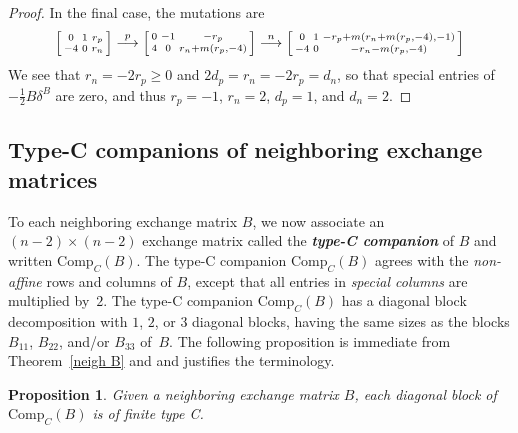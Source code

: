 \documentclass[10pt]{article}
\newtheorem{proposition}{Proposition}[section]
\theoremstyle{definition}
\theoremstyle{remark}
\numberwithin{equation}{section}
\newcommand{\newword}[1]{\textbf{\emph{#1}}}
\newcommand{\0}{{\mathbf{0}}}
\newcommand{\Comp}{\mathrm{Comp}_C}
\begin{document}
\begin{proof}
In the final case, the mutations are
\[\begin{bsmallmatrix*}
0 & 1 & r_p\\
-4 & 0 &r_n
\end{bsmallmatrix*}\overset{p}{\longrightarrow} 
\begin{bsmallmatrix*}
0 & -1 & -r_p\\
4 & 0 &r_n+m(r_p,-4)
\end{bsmallmatrix*}\overset{n}{\longrightarrow} 
\begin{bsmallmatrix*}
0 & 1 &-r_p+m(r_n+m(r_p,-4),-1)\\
-4 & 0 &-r_n-m(r_p,-4)
\end{bsmallmatrix*}
\]
We see that $r_n=-2r_p\ge0$ and $2d_p=r_n=-2r_p=d_n$, so that special entries of~$-\frac12B\delta^B$ are zero, and thus $r_p=-1$, $r_n=2$, $d_p=1$, and $d_n=2$.
\end{proof}

\subsection{Type-C companions of neighboring exchange matrices}\label{type C}
To each neighboring exchange matrix $B$, we now associate an $(n-2)\times(n-2)$ exchange matrix called the \newword{type-C companion} of $B$ and written $\Comp(B)$.
The type-C companion $\Comp(B)$ agrees with the \emph{non-affine} rows and columns of $B$, except that all entries in \emph{special columns} are multiplied by~$2$.
The type-C companion $\Comp(B)$ has a diagonal block decomposition with $1$, $2$, or $3$ diagonal blocks, having the same sizes as the blocks $B_{11}$, $B_{22}$, and/or $B_{33}$ of~$B$.
The following proposition is immediate from Theorem~\ref{neigh B} and \cite[Proposition~3.3]{NS14} and justifies the terminology.

\begin{proposition}\label{Comp is C}
Given a neighboring exchange matrix $B$, each diagonal block of $\Comp(B)$ is of finite type C.
\end{proposition}
%
\end{document}
